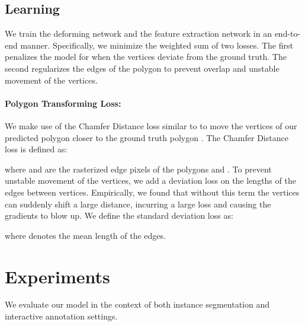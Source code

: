 \documentclass[10pt,twocolumn,letterpaper]{article}
\begin{document}
\subsection{Learning}
We train the deforming network and the feature extraction network in an end-to-end manner.
Specifically, we minimize the weighted sum of two losses. The first penalizes the model for when the vertices deviate from the ground truth. The second regularizes the edges of the polygon to prevent overlap and unstable movement of the vertices. 

\paragraph{Polygon Transforming Loss:}
We make use of the Chamfer Distance loss similar to \cite{HomayounfarMLU18} to move the vertices of our predicted polygon  closer to the ground truth polygon . The Chamfer Distance loss is defined as:

\vspace{-.5mm}
where  and  are the rasterized edge pixels of the polygons  and .
To prevent unstable movement of the vertices, we add a  deviation loss on the lengths of the edges  between  vertices. Empirically, we found that without this term the vertices can suddenly shift a large distance, incurring a large loss and causing the gradients to blow up. We define the standard deviation loss as:

where  denotes the mean length of the edges.




% 

\section{Experiments}
We evaluate our model in the context of both instance segmentation and interactive annotation settings. 

\vspace{-3.5mm}
\end{document}
